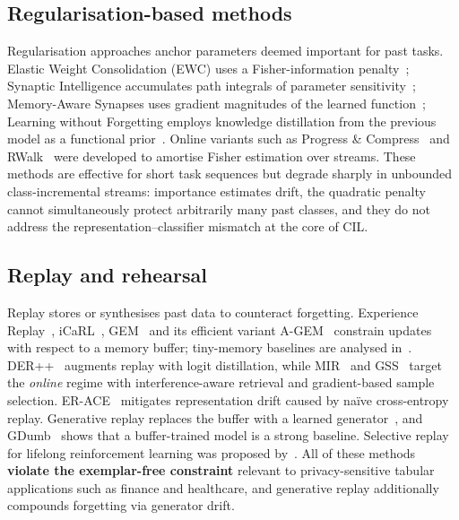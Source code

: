 \documentclass{article}
\begin{document}
\subsection{Regularisation-based methods}
\label{app:related_work:regularisation}

Regularisation approaches anchor parameters deemed important for past tasks.
Elastic Weight Consolidation (EWC) uses a Fisher-information
penalty~\cite{kirkpatrick2017overcoming}; Synaptic Intelligence accumulates path
integrals of parameter sensitivity~\cite{zenke2017continual}; Memory-Aware Synapses
uses gradient magnitudes of the learned function~\cite{aljundi2018memory};
Learning without Forgetting employs knowledge distillation from the previous model
as a functional prior~\cite{li2018learning}.
Online variants such as Progress \& Compress~\cite{schwarz2018progress} and
RWalk~\cite{chaudhry2018riemannian} were developed to amortise Fisher estimation
over streams.
These methods are effective for short task sequences but degrade sharply in unbounded
class-incremental streams: importance estimates drift, the quadratic penalty cannot
simultaneously protect arbitrarily many past classes, and they do not address the
representation--classifier mismatch at the core of CIL.

\subsection{Replay and rehearsal}
\label{app:related_work:replay}

Replay stores or synthesises past data to counteract forgetting.
Experience Replay~\cite{rolnick2019experience}, iCaRL~\cite{rebuffi2017icarl},
GEM~\cite{lopezpaz2017gem} and its efficient variant A-GEM~\cite{chaudhry2019agem}
constrain updates with respect to a memory buffer; tiny-memory baselines are analysed
in~\cite{chaudhry2019tiny}.
DER++~\cite{buzzega2020der} augments replay with logit distillation,
while MIR~\cite{aljundi2019mir} and GSS~\cite{aljundi2019gss} target the
\emph{online} regime with interference-aware retrieval and gradient-based sample selection.
ER-ACE~\cite{caccia2022eracer} mitigates representation drift caused by
na\"{i}ve cross-entropy replay.
Generative replay replaces the buffer with a learned generator~\cite{shin2017dgr},
and GDumb~\cite{prabhu2020gdumb} shows that a buffer-trained model is a strong baseline.
Selective replay for lifelong reinforcement learning was proposed
by~\cite{isele2018selective}.
All of these methods \textbf{violate the exemplar-free constraint} relevant to
privacy-sensitive tabular applications such as finance and healthcare, and generative
replay additionally compounds forgetting via generator drift.
\end{document}
